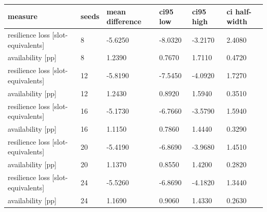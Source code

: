 \begin{tabular}{llllll}
\toprule
measure & seeds & mean difference & ci95 low & ci95 high & ci half-width \\
\midrule
resilience loss [slot-equivalents] & 8 & -5.6250 & -8.0320 & -3.2170 & 2.4080 \\
availability [pp] & 8 & 1.2390 & 0.7670 & 1.7110 & 0.4720 \\
resilience loss [slot-equivalents] & 12 & -5.8190 & -7.5450 & -4.0920 & 1.7270 \\
availability [pp] & 12 & 1.2430 & 0.8920 & 1.5940 & 0.3510 \\
resilience loss [slot-equivalents] & 16 & -5.1730 & -6.7660 & -3.5790 & 1.5940 \\
availability [pp] & 16 & 1.1150 & 0.7860 & 1.4440 & 0.3290 \\
resilience loss [slot-equivalents] & 20 & -5.4190 & -6.8690 & -3.9680 & 1.4510 \\
availability [pp] & 20 & 1.1370 & 0.8550 & 1.4200 & 0.2820 \\
resilience loss [slot-equivalents] & 24 & -5.5260 & -6.8690 & -4.1820 & 1.3440 \\
availability [pp] & 24 & 1.1690 & 0.9060 & 1.4330 & 0.2630 \\
\bottomrule
\end{tabular}
